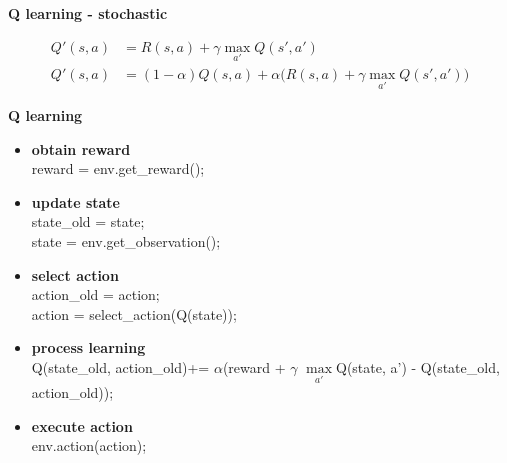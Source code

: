 \documentclass[xcolor=dvipsnames]{beamer}
\begin{document}
\begin{frame}{\bf Q learning - stochastic}


\begin{align*}
Q'(s, a) &= R(s, a) + \gamma \max \limits_{a'} Q(s', a') \\
Q'(s, a) &= (1-\alpha)Q(s, a) + \alpha\Big(R(s, a) + \gamma \max \limits_{a'} Q(s', a')\Big)
\end{align*}


\end{frame}


\begin{frame}{\bf Q learning}

\begin{itemize}
  \item {\color{red} \bf obtain reward} \\
        reward = env.get\_reward();

  \item {\color{red} \bf update state} \\
        state\_old = state; \\
        state = env.get\_observation(); \\

  \item {\color{red} \bf select action} \\
        action\_old = action; \\
        action = select\_action(Q(state)); \\

  \item {\color{red} \bf process learning} \\
    Q(state\_old, action\_old)+= $\alpha$(reward + $\gamma$ $\max \limits_{a'}$Q(state, a') - Q(state\_old, action\_old));

  \item {\color{red} \bf execute action} \\
    env.action(action);

\end{itemize}


\end{frame}
\end{document}
